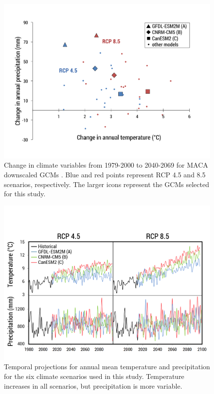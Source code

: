 \documentclass[11pt,letterpaper]{article}
\begin{document}
\begin{figure}
\centering
\includegraphics[width=\textwidth]{figure-files/figure4.png}
\caption{Change in climate variables from 1979-2000 to 2040-2069 for MACA downscaled GCMs \citep{Abatzoglou:2011kca}. Blue and red points represent RCP 4.5 and 8.5 scenarios, respectively. The larger icons represent the GCMs selected for this study.}
\label{fig:ClimateChange}
\end{figure}
\clearpage

\begin{figure}
\centering
\includegraphics[width=\textwidth]{figure-files/figure5.png}
\caption{Temporal projections for annual mean temperature and precipitation for the six climate scenarios used in this study. Temperature increases in all scenarios, but precipitation is more variable.}
\label{fig:ClimateChangeSelected}
\end{figure}
\clearpage
\end{document}
